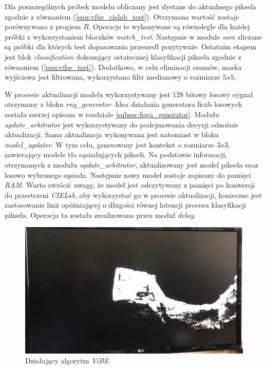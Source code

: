Dla poszczególnych próbek modelu obliczany jest dystans do aktualnego piksela zgodnie z równaniem (\ref{equ:vibe_cielab_test}). 
Otrzymana wartość zostaje porównywana z progiem $R$. 
Operacje te wykonywane są równolegle dla każdej próbki z wykorzystaniem bloczków \textit{match\_test}. 
Następnie w module \textit{sum} zliczane są próbki dla których test dopasowania przeszedł pozytywnie. 
Ostatnim etapem jest blok \textit{classification} dokonujący ostatecznej klasyfikacji piksela zgodnie z równaniem (\ref{equ:vibe_test}). Dodatkowo, w celu eliminacji szumów, maska wyjściowa jest filtrowana, wykorzystano filtr medianowy o rozmiarze $5x5$.

W procesie aktualizacji modelu wykorzystywany jest $128$ bitowy losowy sygnał otrzymany z bloku \textit{rng\_generator}. 
Idea działania generatora liczb losowych została szerzej opisana w rozdziale \ref{subsec:fpga_generator}. 
Modułu \textit{update\_arbitrator} jest wykorzystywany do podejmowania decyzji odnośnie aktualizacji. 
Sama aktualizacja wykonywana jest natomiast w bloku \textit{model\_updater}. 
W tym celu, generowany jest kontekst o rozmiarze $3x3$, zawierający modele tła sąsiadujących pikseli. 
Na podstawie informacji, otrzymanych z modułu \textit{update\_arbitrator}, aktualizowany jest model piksela oraz losowo wybranego sąsiada.
Następnie nowy model zostaje zapisany do pamięci \textit{RAM}. 
Warto zwrócić uwagę, że model jest odczytywany z pamięci po konwersji do przestrzeni \textit{CIELab}, aby wykorzystać go w procesie aktualizacji, konieczne jest zastosowanie linii opóźniającej o długości równej latencji procesu klasyfikacji piksela. 
Operacja ta została zrealizowana przez moduł \textit{delay}.

	\begin{figure}[h!]
		\centering
		\includegraphics[scale=0.2]{img/4/vibe_example.png}
		\caption{Działający algorytm \textit{ViBE}}
		\label{fig:vibe_demo}
	\end{figure}

